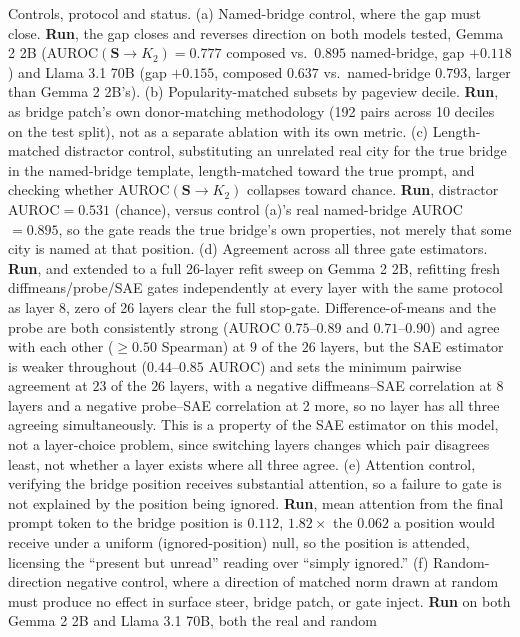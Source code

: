 \documentclass{article}
\newcommand{\gate}{\mathbf{S}}
\begin{document}
Controls, protocol and status. (a) Named-bridge control, where the gap must close. \textbf{Run}, the
gap closes and reverses direction on both models tested, Gemma 2 2B (AUROC$(\gate\!\to\!K_2)=0.777$
composed vs.\ $0.895$ named-bridge, gap $+0.118$) and Llama 3.1 70B (gap $+0.155$, composed $0.637$
vs.\ named-bridge $0.793$, larger than Gemma 2 2B's). (b) Popularity-matched subsets by
pageview decile. \textbf{Run}, as bridge patch's own donor-matching methodology (192 pairs across 10 deciles on
the test split), not as a separate ablation with its own metric. (c) Length-matched distractor
control, substituting an unrelated real city for the true bridge in the named-bridge template,
length-matched toward the true prompt, and checking whether AUROC$(\gate\!\to\!K_2)$ collapses toward
chance. \textbf{Run}, distractor AUROC$=0.531$ (chance), versus control (a)'s real named-bridge
AUROC$=0.895$, so the gate reads the true bridge's own properties, not merely that some city is
named at that position. (d) Agreement across all three gate estimators. \textbf{Run}, and extended to a full 26-layer refit
sweep on Gemma 2 2B, refitting fresh diffmeans/probe/SAE gates independently at every layer with the
same protocol as layer 8, zero of 26 layers clear the full stop-gate. Difference-of-means and the
probe are both consistently strong (AUROC $0.75$--$0.89$ and $0.71$--$0.90$) and agree with each other
($\ge0.50$ Spearman) at $9$ of the $26$ layers, but the SAE estimator is weaker throughout
($0.44$--$0.85$ AUROC) and sets the minimum pairwise agreement at $23$ of the $26$ layers, with a
negative diffmeans--SAE correlation at 8 layers and a negative probe--SAE correlation at 2 more, so no
layer has all three agreeing simultaneously. This is a property of the SAE estimator on this model,
not a layer-choice problem, since switching layers changes which pair disagrees least, not whether a
layer exists where all three agree. (e)
Attention control, verifying the bridge position receives substantial attention, so a
failure to gate is not explained by the position being ignored. \textbf{Run}, mean attention from the
final prompt token to the bridge position is $0.112$, $1.82\times$ the $0.062$ a position would
receive under a uniform (ignored-position) null, so the position is attended, licensing the
``present but unread'' reading over ``simply ignored.'' (f) Random-direction negative
control, where a direction of matched norm drawn at random must produce no effect in surface steer, bridge
patch, or gate inject. \textbf{Run} on both Gemma 2 2B and Llama 3.1 70B, both the real and random
\end{document}
